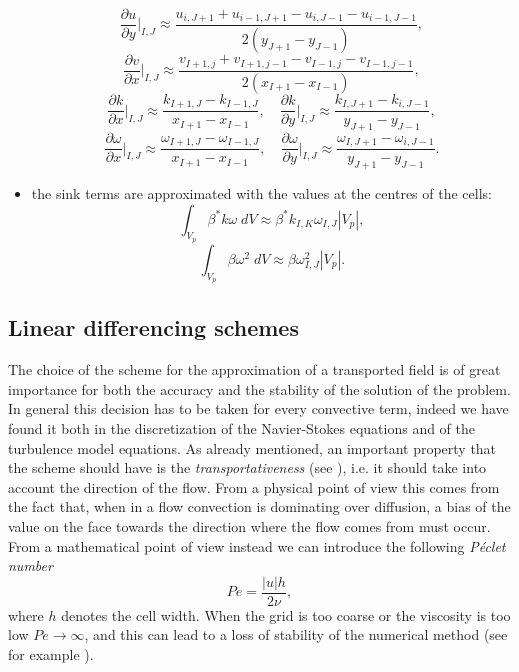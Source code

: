 \begin{itemize}
	\begin{equation}
	\frac{\partial u}{\partial y}\Big|_{I,J} \approx 
	\frac{u_{i,J+1}+u_{i-1,J+1}-u_{i,J-1}-u_{i-1,J-1}}{2(y_{J+1}-y_{J-1})},
	\end{equation}
	\begin{equation}
	\frac{\partial v}{\partial x} \Big|_{I,J} \approx 
	\frac{v_{I+1,j}+v_{I+1,j-1}-v_{I-1,j}-v_{I-1,j-1}}{2(x_{I+1}-x_{I-1})},
	\end{equation}
	\begin{equation}
	\frac{\partial k}{\partial x}\Big|_{I,J} \approx \frac{k_{I+1,J} - 
		k_{I-1,J}}{x_{I+1} - x_{I-1}}, 
	\quad \frac{\partial k}{\partial y}\Big|_{I,J} \approx 
	\frac{k_{I,J+1}-k_{i,J-1}}{y_{J+1}-y_{J-1}},
	\end{equation}
	\begin{equation}
	\frac{\partial \omega}{\partial x}\Big|_{I,J} \approx 
	\frac{\omega_{I+1,J} - \omega_{I-1,J}}{x_{I+1} - x_{I-1}}, \quad 
	\frac{\partial \omega}{\partial y}\Big|_{I,J} \approx 
	\frac{\omega_{I,J+1}-\omega_{i,J-1}}{y_{J+1}-y_{J-1}}.
	\end{equation}
	\item the sink terms are approximated with the values at the centres of the 
	cells:
	\begin{equation}
	\int_{V_p} \beta^* k \omega \; dV \approx 
	\beta^*k_{I,K}\omega_{I,J}|V_p|,
	\end{equation}
	\begin{equation}
	\int_{V_p} \beta \omega^2 \; dV \approx \beta \omega_{I,J}^2 |V_p|.
	\end{equation}
\end{itemize}
%
\subsection{Linear differencing schemes} \label{subsec:diffscheme}
The choice of the scheme for the approximation of a transported field is of 
great importance for both the accuracy and the stability of the solution of the 
problem. In general this decision has to be taken for every convective term, 
indeed we have found it both in the discretization of the Navier-Stokes equations
and of the turbulence model equations. As already mentioned, an 
important property that the scheme should have is the \emph{transportativeness} 
(see \cite{main:vermal}), i.e. it should take into account the direction of the 
flow. From a physical point of view this comes from the fact that, when in a 
flow convection is dominating over diffusion, a bias of the value on the face 
towards the direction where the flow comes from must occur. From a mathematical 
point of view instead we can introduce the following \emph{Péclet number}
\begin{equation}
	Pe = \frac{|u| h}{2\nu},
\end{equation}
where $h$ denotes the cell width. When the grid is too coarse or the viscosity 
is too low $Pe\rightarrow\infty$, and this can lead to a loss of stability of 
the numerical method (see for example \cite{main:quarteroni}).

